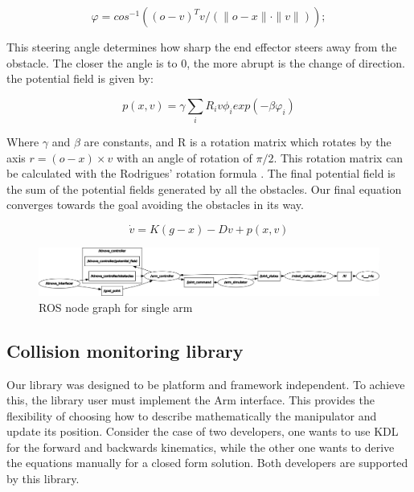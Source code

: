 \documentclass[a4paper, 10pt, conference]{ieeeconf}      %
\begin{document}
\begin{equation} \label{eq:2}
	\varphi = cos^{-1} ((o-v)^T v / (\|o-x\| \cdot \|v\|));
\end{equation}

This steering angle determines how sharp the end effector steers away from the obstacle. The closer the angle is to 0, the more abrupt is the change of direction. the potential field is given by:

\begin{equation}
	p(x, v) = \gamma \sum_i R_i v \phi_i exp(-\beta \varphi_i) 
\end{equation}

Where $\gamma$ and $\beta$ are constants, and R is a rotation matrix which rotates by the axis $r = (o-x) \times v $ with an angle of rotation of $\pi/2$. This rotation matrix can be calculated with the Rodrigues' rotation formula \cite{rodrigues}. The final potential field is the sum of the potential fields generated by all the obstacles. Our final equation converges towards the goal avoiding the obstacles in its way.

\begin{equation}
\dot{v} = K ( g - x ) - D v + p(x, v)
\end{equation}

\begin{figure}[t]
	\centering
	\includegraphics[scale=0.25]{images/rosgraph_single.png}
	\caption{ROS node graph for single arm}
	\label{fig:rosgraph_single}
\end{figure}

\subsection{Collision monitoring library} %

Our library was designed to be platform and framework independent. To achieve this, the library user must implement the Arm interface. This provides the flexibility of choosing how to describe mathematically the manipulator and update its position. Consider the case of two developers, one wants to use KDL for the forward and backwards kinematics, while the other one wants to derive the equations manually for a closed form solution. Both developers are supported by this library. 
\end{document}
